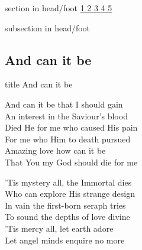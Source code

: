 \documentclass[aspectratio=169]{beamer}
\begin{document}
{
{ 
 {
 \begin{beamercolorbox}[ht=4.5ex,dp=1.5ex,%
      leftskip=.3cm,rightskip=.3cm plus1fil]{section in head/foot}
 \fontsize{12}{25}\selectfont 
\hyperlink{And can it be[]1}{1  }\hyperlink{And can it be[]2}{2  }\hyperlink{And can it be[]3}{3  }\hyperlink{And can it be[]4}{4  }\hyperlink{And can it be[]5}{5  } 
 \end{beamercolorbox}%
  \begin{beamercolorbox}[ht=2.5ex,dp=1.125ex,%
   leftskip=.3cm,rightskip=.3cm plus1fil]{subsection in head/foot}
   \insertauthor
 \end{beamercolorbox}%
 }
}
\subsection{And can it be}
\hypertarget{And can it be[]}{}
\begin{frame}{}
 \vfill
  \centering
  \begin{beamercolorbox}[sep=8pt,center,shadow=true,rounded=true]{title}
    And can it be     
  \end{beamercolorbox}
  \vfill
\end{frame}

\hypertarget{And can it be[]1}{}
\begin{frame}{}
\fontsize{21.951219512195124}{26.34146341463415}\selectfont

And can it be that I should gain\\ 
An interest in the Saviour's blood\\ 
Died He for me who caused His pain\\ 
For me who Him to death pursued\\ 
Amazing love how can it be\\ 
That You my God should die for me

\end{frame}
\hypertarget{And can it be[]2}{}
\begin{frame}{}
\fontsize{21.951219512195124}{26.34146341463415}\selectfont

'Tis mystery all, the Immortal dies\\ 
Who can explore His strange design\\ 
In vain the first-born seraph tries\\ 
To sound the depths of love divine\\ 
'Tis mercy all, let earth adore\\ 
Let angel minds enquire no more


\end{frame}}
\end{document}
